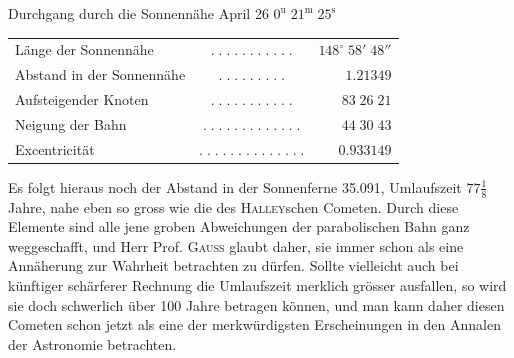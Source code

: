 \begin{center}\fontsize{10}{12}\selectfont Durchgang durch die Sonnennähe April 26 $0^{\mathrm u}\;21^{\mathrm m}\;25^{\mathrm s}$\end{center}
\begin{center}\fontsize{10}{12}\selectfont\setlength{\tabcolsep}{3pt}\renewcommand{\arraystretch}{1.15}\begin{tabular}{lcr}
Länge der Sonnennähe & $.\;.\;.\;.\;.\;.\;.\;.\;.\;.\;.$ & $148^\circ\;58'\;48''$\\
Abstand in der Sonnennähe & $.\;.\;.\;.\;.\;.\;.\;.\;.$ & $1.21349$\\
Aufsteigender Knoten & $.\;.\;.\;.\;.\;.\;.\;.\;.\;.\;.$ & $83\;26\;21$\\
Neigung der Bahn & $.\;.\;.\;.\;.\;.\;.\;.\;.\;.\;.\;.\;.$ & $44\;30\;43$\\
Excentricität & $.\;.\;.\;.\;.\;.\;.\;.\;.\;.\;.\;.\;.\;.$ & $0.933149$\\
\end{tabular}\end{center}

\par\indent Es folgt hieraus noch der Abstand in der Sonnenferne 35.091, Umlaufszeit $77\frac{1}{8}$ Jahre,
nahe eben so gross wie die des \textsc{Halley}schen Cometen. Durch diese Elemente sind alle jene groben
Abweichungen der parabolischen Bahn ganz weggeschafft, und Herr Prof. \textsc{Gauss} glaubt daher, sie
immer schon als eine Annäherung zur Wahrheit betrachten zu dürfen. Sollte vielleicht auch bei
künftiger schärferer Rechnung die Umlaufszeit merklich grösser ausfallen, so wird sie doch
schwerlich über 100 Jahre betragen können, und man kann daher diesen Cometen schon jetzt als eine
der merkwürdigsten Erscheinungen in den Annalen der Astronomie betrachten.
